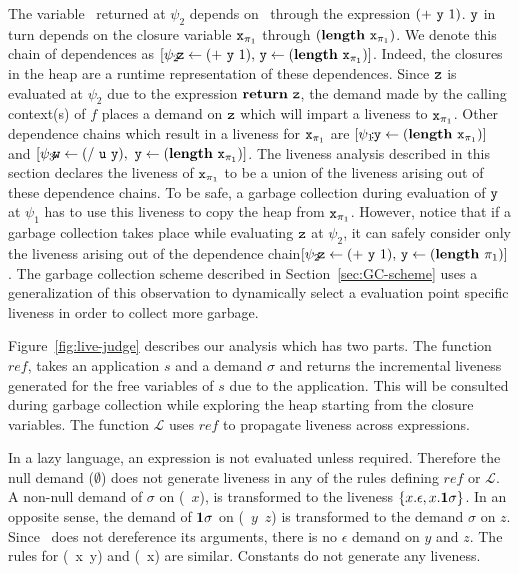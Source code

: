 \documentclass[preprint, 9pt]{sigplanconf}
\begin{document}
The  variable \pz\   returned  at  $\psi_2$ depends  on  \py\ 
  through  the  expression $(+~\mbox{\tt y}~1)$.   $\mbox{\tt y}$  in  turn depends  on  the
  closure  variable  $\mbox{\tt x}_{\mathit{\pi}_1}$   through  $(\mathbf{length}~\mbox{\tt x}_{\mathit{\pi}_1})$.   We
  denote  this chain  of dependences  as $\lbrack  \psi_2\!\!\!:\!\!\!\mbox{\tt z} \leftarrow
  (+~\mbox{\tt y}~1),\,  \mbox{\tt y}  \leftarrow   (\mathbf{length}~\mbox{\tt x}_{\mathit{\pi}_1})\rbrack$.   Indeed,  the
  closures  in  the  heap  are   a  runtime  representation  of  these
  dependences.  Since  $\mbox{\tt z}$  is  evaluated   at  $\psi_2$  due  to  the
  expression $\mbox{$\mathbf{ return}$}~\mbox{\tt z}$,  the demand made by  the calling context(s)
  of  $f$ places  a demand  on  $\mbox{\tt z}$ which  will impart  a liveness  to
  $\mbox{\tt x}_{\pi_1}$.  Other dependence chains which result in a liveness for
  $\mbox{\tt x}_{\pi_1}$       are       $\lbrack       \psi_1\!\!\!:\!\!\mbox{\tt y}       \leftarrow
  (\mathbf{length}~\mbox{\tt x}_{\pi_1})\rbrack$ and $\lbrack \psi_3\!\!\!:\!\!\!\mbox{\tt w} \leftarrow (/~\mbox{\tt u}~\mbox{\tt y}),\,\,
  \mbox{\tt y}  \leftarrow  (\mathbf{length}~\mbox{\tt x}_{\pi_1})\rbrack$.   The  liveness  analysis
  described in this section declares the liveness of $\mbox{\tt x}_{\pi_1}$ to be
  a union of the liveness arising  out of these dependence chains.  To
  be safe, a  garbage collection during evaluation of  $\mbox{\tt y}$ at $\psi_1$
  has  to  use  this  liveness  to copy  the  heap  from  $\mbox{\tt x}_{\pi_1}$.
  However,  notice that  if  a garbage  collection  takes place  while
  evaluating $\mbox{\tt z}$ at $\psi_2$, it can safely consider only the liveness
  arising  out of  the dependence  chain\linebreak $\lbrack  \psi_2\!\!\!:\!\!\!\pz \leftarrow
  (+~\py~1),\,   \py  \leftarrow   (\length~\x_{\pi_1})\rbrack$.   The   garbage
  collection  scheme described  in Section~\ref{sec:GC-scheme}  uses a
  generalization  of   this  observation   to  dynamically   select  a
  evaluation point specific liveness in order to collect more garbage.



Figure~\ref{fig:live-judge}  describes  our  analysis  which  has  two
parts. The  function $\mathit{ref}$,  takes an  application $s$  and a
demand $\sigma$ and returns the incremental liveness generated for the
free variables of $s$ due to  the application.  This will be consulted
during garbage collection  while exploring the heap  starting from the
closure  variables.  The function $\mathcal{L}$  uses  $\mathit{ref}$ to  propagate
liveness across expressions.

In  a   lazy  language,   an  expression   is  not   evaluated  unless
required. Therefore  the null  demand ($\emptyset$) does  not generate
liveness in any of the rules defining $\mathit{ref}$ or $\mathcal{L}$.
A non-null  demand of  $\sigma$ on (\CDR~$x$),  is transformed  to the
liveness $\{x.\epsilon,  x.\mathbf{1}\sigma\}$.  In an opposite  sense, the
demand  of  $\mathbf{1}\sigma$ on  (\CONS~$y$~$z$)  is  transformed to  the
demand  $\sigma$  on  $z$.   Since \CONS\  does  not  dereference  its
arguments, there  is no $\epsilon$ demand  on $y$ and $z$.   The rules
for (\PRIM~x~y) and (\NULLQ~x) are  similar. Constants do not generate
any liveness.
\end{document}
